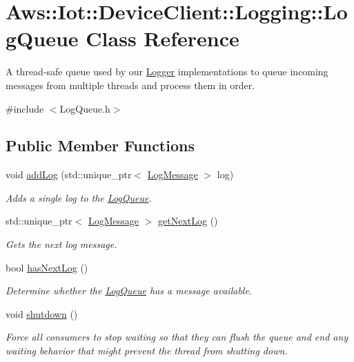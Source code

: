 \hypertarget{class_aws_1_1_iot_1_1_device_client_1_1_logging_1_1_log_queue}{}\section{Aws\+:\+:Iot\+:\+:Device\+Client\+:\+:Logging\+:\+:Log\+Queue Class Reference}
\label{class_aws_1_1_iot_1_1_device_client_1_1_logging_1_1_log_queue}


A thread-\/safe queue used by our \hyperlink{class_aws_1_1_iot_1_1_device_client_1_1_logging_1_1_logger}{Logger} implementations to queue incoming messages from multiple threads and process them in order.  




{\ttfamily \#include $<$Log\+Queue.\+h$>$}

\subsection*{Public Member Functions}
\begin{DoxyCompactItemize}
\item 
void \hyperlink{class_aws_1_1_iot_1_1_device_client_1_1_logging_1_1_log_queue_aaa3cf9fd1a81682f9e9a44bbce487308}{add\+Log} (std\+::unique\+\_\+ptr$<$ \hyperlink{class_aws_1_1_iot_1_1_device_client_1_1_logging_1_1_log_message}{Log\+Message} $>$ log)
\begin{DoxyCompactList}\small\item\em Adds a single log to the \hyperlink{class_aws_1_1_iot_1_1_device_client_1_1_logging_1_1_log_queue}{Log\+Queue}. \end{DoxyCompactList}\item 
std\+::unique\+\_\+ptr$<$ \hyperlink{class_aws_1_1_iot_1_1_device_client_1_1_logging_1_1_log_message}{Log\+Message} $>$ \hyperlink{class_aws_1_1_iot_1_1_device_client_1_1_logging_1_1_log_queue_a0db76ccf436b508b17d82fccaff63eb4}{get\+Next\+Log} ()
\begin{DoxyCompactList}\small\item\em Gets the next log message. \end{DoxyCompactList}\item 
bool \hyperlink{class_aws_1_1_iot_1_1_device_client_1_1_logging_1_1_log_queue_a400cd1c4ec72d56c544d32a49be15012}{has\+Next\+Log} ()
\begin{DoxyCompactList}\small\item\em Determine whether the \hyperlink{class_aws_1_1_iot_1_1_device_client_1_1_logging_1_1_log_queue}{Log\+Queue} has a message available. \end{DoxyCompactList}\item 
void \hyperlink{class_aws_1_1_iot_1_1_device_client_1_1_logging_1_1_log_queue_a09549fcdba5c73d9005909e24060affe}{shutdown} ()
\begin{DoxyCompactList}\small\item\em Force all consumers to stop waiting so that they can flush the queue and end any waiting behavior that might prevent the thread from shutting down. \end{DoxyCompactList}\end{DoxyCompactItemize}
